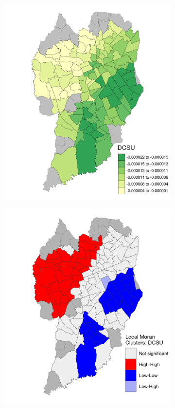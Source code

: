 \begin{figure}[!htbp]
    \centering\footnotesize
    \captionsetup{font=footnotesize}
    \caption{DCSU COEFFICIENT ESTIMATES}
    \begin{subfigure}{0.5\textwidth}
        \includegraphics{fig/DCSU.png}
    \end{subfigure}%
    \begin{subfigure}{0.5\textwidth}
        \includegraphics{fig/lisa_DCSU.png}

\end{subfigure}
\end{figure}
